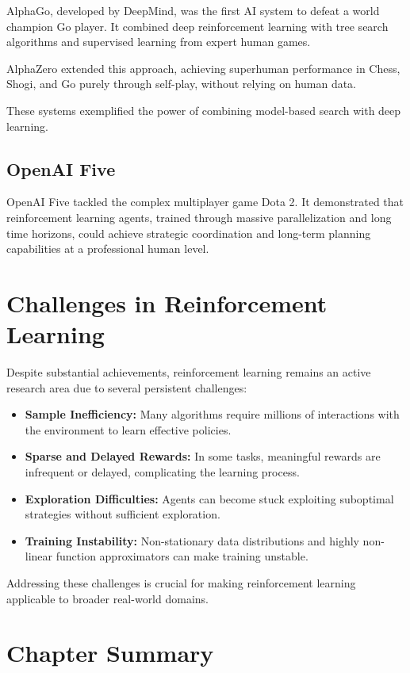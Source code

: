 \documentclass[openany]{book}
\begin{document}
AlphaGo, developed by DeepMind, was the first AI system to defeat a world 
champion Go player. It combined deep reinforcement learning with tree search 
algorithms and supervised learning from expert human games.

AlphaZero extended this approach, achieving superhuman performance in Chess, 
Shogi, and Go purely through self-play, without relying on human data.

These systems exemplified the power of combining model-based search with deep 
learning.

\subsection{OpenAI Five}

OpenAI Five tackled the complex multiplayer game Dota 2. It demonstrated that 
reinforcement learning agents, trained through massive parallelization and long 
time horizons, could achieve strategic coordination and long-term planning 
capabilities at a professional human level.

\section{Challenges in Reinforcement Learning}

Despite substantial achievements, reinforcement learning remains an active 
research area due to several persistent challenges:

\begin{itemize}
    \item \textbf{Sample Inefficiency:} Many algorithms require millions of 
    interactions with the environment to learn effective policies.
    \item \textbf{Sparse and Delayed Rewards:} In some tasks, meaningful rewards 
    are infrequent or delayed, complicating the learning process.
    \item \textbf{Exploration Difficulties:} Agents can become stuck exploiting 
    suboptimal strategies without sufficient exploration.
    \item \textbf{Training Instability:} Non-stationary data distributions and 
    highly non-linear function approximators can make training unstable.
\end{itemize}

Addressing these challenges is crucial for making reinforcement learning 
applicable to broader real-world domains.

\section{Chapter Summary}
\end{document}
